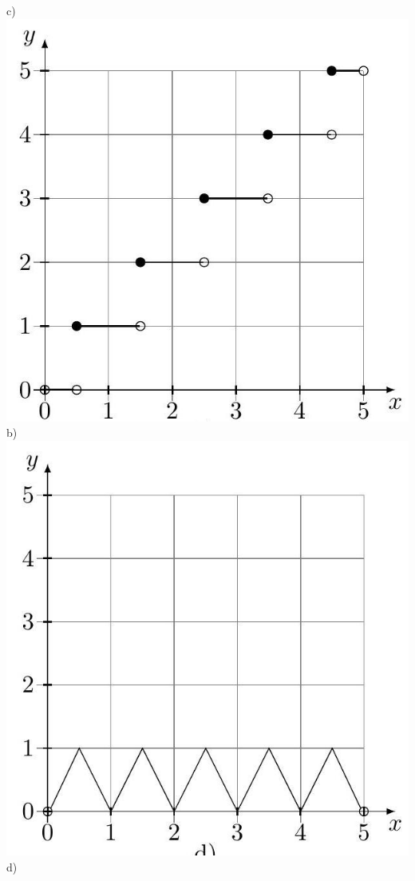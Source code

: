 \documentclass[10pt]{article}
\begin{document}
\begin{enumerate}
c)\\
\includegraphics[max width=\textwidth, center]{2024_11_21_e9b4faa005d5be2cc318g-125(1)}\\
b)\\
\includegraphics[max width=\textwidth, center]{2024_11_21_e9b4faa005d5be2cc318g-125(3)}\\
d)
\end{enumerate}
\end{document}
